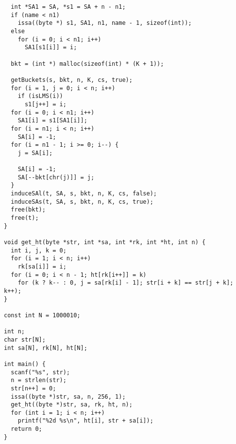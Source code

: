 \begin{verbatim}
  int *SA1 = SA, *s1 = SA + n - n1;
  if (name < n1)
    issa((byte *) s1, SA1, n1, name - 1, sizeof(int));
  else            
    for (i = 0; i < n1; i++)
      SA1[s1[i]] = i;

  bkt = (int *) malloc(sizeof(int) * (K + 1));  

  getBuckets(s, bkt, n, K, cs, true);  
  for (i = 1, j = 0; i < n; i++)
    if (isLMS(i))
      s1[j++] = i;    
  for (i = 0; i < n1; i++)
    SA1[i] = s1[SA1[i]];  
  for (i = n1; i < n; i++)
    SA[i] = -1;        
  for (i = n1 - 1; i >= 0; i--) {
    j = SA[i];

    SA[i] = -1;
    SA[--bkt[chr(j)]] = j;
  }
  induceSAl(t, SA, s, bkt, n, K, cs, false);
  induceSAs(t, SA, s, bkt, n, K, cs, true);
  free(bkt);
  free(t);
}

void get_ht(byte *str, int *sa, int *rk, int *ht, int n) {
  int i, j, k = 0;
  for (i = 1; i < n; i++)
    rk[sa[i]] = i;
  for (i = 0; i < n - 1; ht[rk[i++]] = k)
    for (k ? k-- : 0, j = sa[rk[i] - 1]; str[i + k] == str[j + k]; k++);
}

const int N = 1000010;

int n;
char str[N];
int sa[N], rk[N], ht[N];

int main() {
  scanf("%s", str);
  n = strlen(str);
  str[n++] = 0;
  issa((byte *)str, sa, n, 256, 1);
  get_ht((byte *)str, sa, rk, ht, n);
  for (int i = 1; i < n; i++)
    printf("%2d %s\n", ht[i], str + sa[i]);
  return 0;
}
\end{verbatim}

